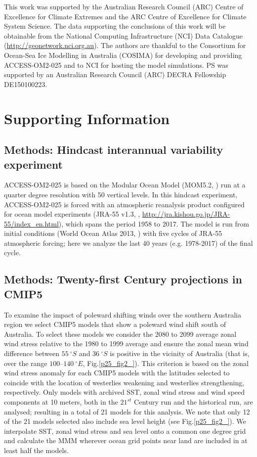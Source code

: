 \documentclass[draft,linenumbers]{agujournal2018}
\begin{document}
\acknowledgments
This work was supported by the Australian Research Council (ARC) Centre of Excellence for Climate Extremes and the ARC Centre of Excellence for Climate System Science. The data supporting the conclusions of this work will be obtainable from the National Computing Infrastructure (NCI) Data Catalogue (\url{http://geonetwork.nci.org.au}). The authors are thankful to the Consortium for Ocean-Sea Ice Modelling in Australia (COSIMA) for developing and providing ACCESS-OM2-025 and to NCI for hosting the model simulations. PS was supported by an Australian Research Council (ARC) DECRA Fellowship DE150100223.
 


\appendix
\section{Supporting Information}

\subsection{Methods: Hindcast interannual variability experiment}
ACCESS-OM2-025 is based on the Modular Ocean Model (MOM5.2, \citealp{Griffies2012}) run at a quarter degree resolution with 50 vertical levels. In this hindcast experiment, ACCESS-OM2-025 is forced with an atmospheric reanalysis product configured for ocean model experiments (JRA-55 v1.3, \citealp{Kobayashi2015}, \url{http://jra.kishou.go.jp/JRA-55/index_en.html}), which spans the period 1958 to 2017. The model is run from initial conditions (World Ocean Atlas 2013, \citealp{Boyer2013}) with five cycles of JRA-55 atmospheric forcing; here we analyze the last 40 years (e.g. 1978-2017) of the final cycle.

\subsection{Methods: Twenty-first Century projections in CMIP5}
To examine the impact of poleward shifting winds over the southern Australia region we select CMIP5 models that show a poleward wind shift south of Australia. To select these models we consider the 2080 to 2099 average zonal wind stress relative to the 1980 to 1999 average and ensure the zonal mean wind difference between $55\ ^{\circ}S$ and $36\ ^{\circ}S$ is positive in the vicinity of Australia (that is, over the range $100$--$140\ ^{\circ}E$, Fig.\ref{p25_fig2_}). This criterion is based on the zonal wind stress anomaly for each CMIP5 models with the latitudes selected to coincide with the location of westerlies weakening and westerlies strengthening, respectively. Only models with archived SST, zonal wind stress and wind speed components at 10 meters, both in the $21^{st}$ Century run and the historical run, are analysed; resulting in a total of 21 models for this analysis. We note that only 12 of the 21 models selected also include sea level height (see Fig.\ref{p25_fig2_}). We interpolate SST, zonal wind stress and sea level onto a common one degree grid and calculate the MMM wherever ocean grid points near land are included in at least half the models.
\end{document}
